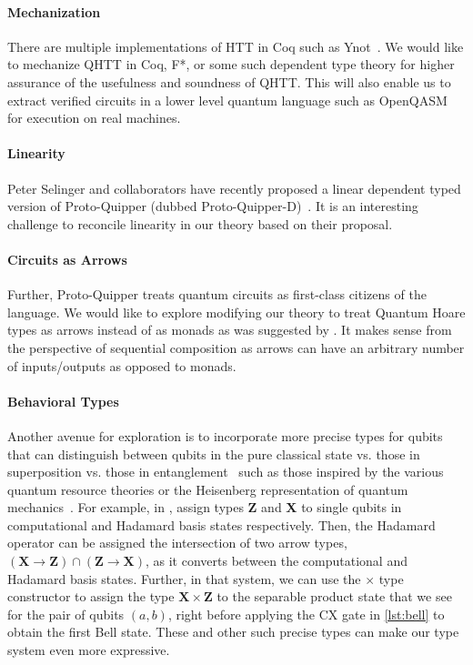 \paragraph{Mechanization} There are multiple implementations of HTT in Coq such as Ynot~\parencite{ynot2008}. We would like to mechanize QHTT in Coq, F*, or some such dependent type theory for higher assurance of the usefulness and soundness of QHTT. This will also enable us to extract verified circuits in a lower level quantum language such as OpenQASM~\parencite{cross2017} for execution on real machines.

\paragraph{Linearity} Peter Selinger and collaborators have recently proposed a linear dependent typed version of Proto-Quipper (dubbed Proto-Quipper-D)~\parencite{selinger2020,fu2020linear}. It is an interesting challenge to reconcile linearity in our theory based on their proposal.

\paragraph{Circuits as Arrows} Further, Proto-Quipper treats quantum circuits as first-class citizens of the language. We would like to explore modifying our theory to treat Quantum Hoare types as arrows instead of as monads as was suggested by \textcite{so-arrows}. It makes sense from the perspective of sequential composition as arrows can have an arbitrary number of inputs/outputs as opposed to monads.

\paragraph{Behavioral Types} Another avenue for exploration is to incorporate more precise types for qubits that can distinguish between qubits in the pure classical state vs. those in superposition vs. those in entanglement~\parencite{JorrandPerdrix2009} such as those inspired by the various quantum resource theories or the Heisenberg representation of quantum mechanics~\parencite{rssl2019,rssl20}. For example, in , \textcite{rssl20} assign types \textbf{Z} and \textbf{X} to single qubits in computational and Hadamard basis states respectively. Then, the Hadamard operator can be assigned the intersection of two arrow types, $(\mathbf{X} \rightarrow \mathbf{Z}) \cap (\mathbf{Z} \rightarrow \mathbf{X})$, as it converts between the computational and Hadamard basis states. Further, in that system, we can use the $\times$ type constructor to assign the type $\mathbf{X} \times \mathbf{Z}$ to the separable product state that we see for the pair of qubits $(a, b)$, right before applying the CX gate in \cref{lst:bell} to obtain the first Bell state. These and other such precise types can make our type system even more expressive.

